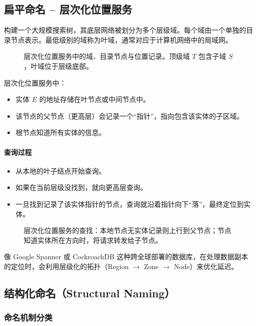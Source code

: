 \subsection{扁平命名 -- 层次化位置服务}

构建一个大规模搜索树，其底层网络被划分为多个层级域。每个域由一个单独的目录节点表示。最低级别的域称为叶域，通常对应于计算机网络中的局域网。

\begin{figure}[H]
  \centering
  \caption{层次化位置服务中的域、目录节点与位置记录。顶级域 \(T\) 包含子域 \(S\)，叶域位于层级底部。}
\end{figure}

层次化位置服务中：
\begin{itemize}
  \item 实体 \(E\) 的地址存储在叶节点或中间节点中。
  \item 该节点的父节点（更高层）会记录一个“指针”，指向包含该实体的子区域。
  \item 根节点知道所有实体的信息。
\end{itemize}

\paragraph{查询过程}
\begin{itemize}
  \item 从本地的叶子结点开始查询。
  \item 如果在当前层级没找到，就向更高层查询。
  \item 一旦找到记录了该实体指针的节点，查询就沿着指针向下“落”，最终定位到实体。
\end{itemize}

\begin{figure}[H]
  \centering
  \caption{层次化位置服务的查找：本地节点无实体记录则上行到父节点；节点知道实体所在方向时，将请求转发给子节点。}
\end{figure}

像 Google Spanner 或 CockroachDB 这种跨全球部署的数据库，在处理数据副本的定位时，会利用层级化的拓扑（Region \(\to\) Zone \(\to\) Node）来优化延迟。

\subsection{结构化命名（Structural Naming）}

\subsubsection{命名机制分类}

